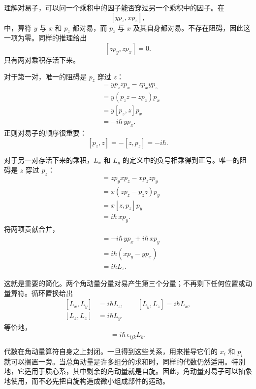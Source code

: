 \begin{classroomqa}
\end{classroomqa}

理解对易子，可以问一个乘积中的因子能否穿过另一个乘积中的因子。在
\[
[yp_z,xp_z],
\]
中，算符 \(y\) 与 \(x\) 和 \(p_z\) 都对易，而 \(p_z\) 与 \(x\) 及其自身都对易。不存在阻碍，因此这一项为零。同样的推理给出
\[
[zp_y,zp_x]=0.
\]
只有两对乘积存活下来。

对于第一对，唯一的阻碍是 \(p_z\) 穿过 \(z\)：
\begin{align}
[yp_z,zp_x]
&=yp_zzp_x-zp_xyp_z \\
&=y(p_zz-zp_z)p_x \\
&=y[p_z,z]p_x \\
&=-i\hbar\,yp_x.
\end{align}
正则对易子的顺序很重要：
\[
[p_z,z]=-[z,p_z]=-i\hbar.
\]

对于另一对存活下来的乘积，\(L_x\) 和 \(L_y\) 的定义中的负号相乘得到正号。唯一的阻碍是 \(z\) 穿过 \(p_z\)：
\begin{align}
[zp_y,xp_z]
&=zp_yxp_z-xp_zzp_y \\
&=x(zp_z-p_zz)p_y \\
&=x[z,p_z]p_y \\
&=i\hbar\,xp_y.
\end{align}
将两项贡献合并，
\begin{align}
[L_x,L_y]
&=-i\hbar\,yp_x+i\hbar\,xp_y \\
&=i\hbar(xp_y-yp_x) \\
&=i\hbar L_z.
\end{align}

这就是重要的简化。两个角动量分量对易产生第三个分量；不再剩下任何位置或动量算符。循环置换给出
\begin{equation}
\begin{aligned}
[L_x,L_y]&=i\hbar L_z,\qquad
[L_y,L_z]=i\hbar L_x,\\
[L_z,L_x]&=i\hbar L_y.
\end{aligned}
\end{equation}
等价地，
\begin{equation}
[L_i,L_j]=i\hbar\,\epsilon_{ijk}L_k.
\end{equation}

代数在角动量算符自身之上封闭。一旦得到这些关系，用来推导它们的 \(x_i\) 和 \(p_i\) 就可以搁置一旁。当总角动量是许多组分的求和时，同样的代数仍然适用。特别地，它适用于质心系，其中剩余的角动量就是自旋。因此，角动量对易子可以抽象地使用，而不必先把自旋构造成微小组成部件的运动。

